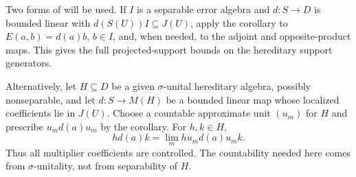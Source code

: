 \begin{remark}\label{sm:multiplier-coefficients}
Two forms of  will be used.
If \(I\) is a separable error algebra and
\(d:S\to D\) is bounded linear with
\(d(S(U))I\subseteq J(U)\), apply the corollary to
\(E(a,b)=d(a)b\), \(b\in I\), and, when needed, to the
adjoint and opposite-product maps.  This gives the full
projected-support bounds on the hereditary support
generators.

Alternatively, let \(H\subseteq D\) be a given
\(\sigma\)-unital hereditary algebra, possibly nonseparable,
and let \(d:S\to M(H)\) be a bounded linear map whose
localized coefficients lie in \(J(U)\).
Choose a countable approximate unit \((u_m)\) for \(H\)
and prescribe \(u_md(a)u_m\) by the corollary.  For
\(h,k\in H\),
\[
 h d(a)k=\lim_m h u_m d(a)u_m k.
\]
Thus all multiplier coefficients are controlled.  The
countability needed here comes from \(\sigma\)-unitality,
not from separability of \(H\).
\end{remark}
